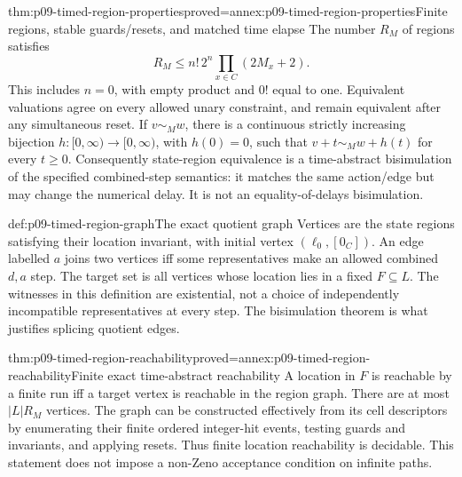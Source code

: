 \begin{hbtheorem}{thm:p09-timed-region-properties}{proved=annex:p09-timed-region-properties}{Finite regions, stable guards/resets, and matched time elapse}
The number \(R_M\) of regions satisfies
\[
 R_M\leq n!\,2^n\prod_{x\in C}(2M_x+2).
\]
This includes \(n=0\), with empty product and \(0!\) equal to one.
Equivalent valuations agree on every allowed unary constraint, and remain
equivalent after any simultaneous reset. If \(v\sim_M w\), there is a
continuous strictly increasing bijection
\(h:[0,\infty)\to[0,\infty)\), with \(h(0)=0\), such that
\(v+t\sim_M w+h(t)\) for every \(t\geq0\).
Consequently state-region equivalence is a time-abstract bisimulation of
the specified combined-step semantics: it matches the same action/edge but
may change the numerical delay. It is not an equality-of-delays bisimulation.
\end{hbtheorem}

\begin{hbdefinition}{def:p09-timed-region-graph}{The exact quotient graph}
Vertices are the state regions satisfying their location invariant, with
initial vertex \((\ell_0,[0_C])\). An edge labelled \(a\) joins two
vertices iff some representatives make an allowed combined \(d,a\) step.
The target set is all vertices whose location lies in a fixed
\(F\subseteq L\). The witnesses in this definition are existential,
not a choice of independently incompatible representatives at every step.
The bisimulation theorem is what justifies splicing quotient edges.
\end{hbdefinition}

\begin{hbtheorem}{thm:p09-timed-region-reachability}{proved=annex:p09-timed-region-reachability}{Finite exact time-abstract reachability}
A location in \(F\) is reachable by a finite run iff a target vertex is
reachable in the region graph. There are at most \(|L|R_M\) vertices.
The graph can be constructed effectively from its cell descriptors by
enumerating their finite ordered integer-hit events, testing guards and
invariants, and applying resets. Thus finite location reachability is
decidable. This statement does not impose a non-Zeno acceptance condition
on infinite paths.
\end{hbtheorem}


